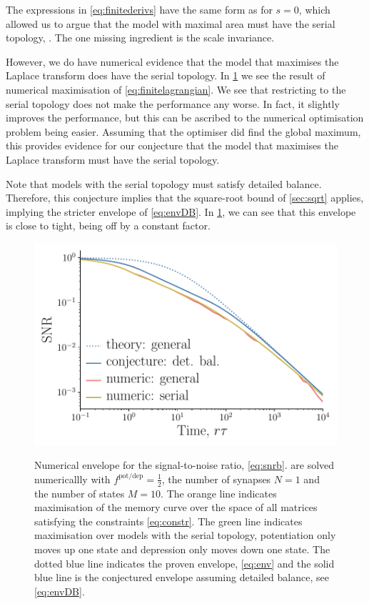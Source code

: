 \documentclass[12pt]{article}
\newcommand{\potdep}{^{\text{pot/dep}}}
\begin{document}
The expressions in \cref{eq:finitederivs} have the same form as for \(s=0\), which allowed us to argue that the model with maximal area must have the serial topology, \cite{Lahiri2013synapse}.
The one missing ingredient is the scale invariance.

However, we do have numerical evidence that the model that maximises the Laplace transform does have the serial topology.
In \cref{fig:envnum} we see the result of numerical maximisation of \cref{eq:finitelagrangian}.
We see that restricting to the serial topology does not make the performance any worse.
In fact, it slightly improves the performance, but this can be ascribed to the numerical optimisation problem being easier.
Assuming that the optimiser did find the global maximum, this provides evidence for our conjecture that the model that maximises the Laplace transform must have the serial topology.

Note that models with the serial topology must satisfy detailed balance.
Therefore, this conjecture implies that the square-root bound of \cref{sec:sqrt} applies, implying the stricter envelope of \cref{eq:envDB}.
In \cref{fig:envnum}, we can see that this envelope is close to tight, being off by a constant factor.


\begin{figure}[tb]
  \centering
  \includegraphics[width=0.8\linewidth]{LenvNum.pdf}\\
  \caption[Numerical envelope for the signal-to-noise ratio]
  {Numerical envelope for the signal-to-noise ratio, \eqref{eq:snrb}. 
   are solved numericallly with \(f\potdep=\frac{1}{2}\), the number of synapses \(N=1\) and the number of states \(M=10\).
  The orange line indicates maximisation of the memory curve over the space of all matrices satisfying the constraints \eqref{eq:constr}.
  The green line indicates maximisation over models with the serial topology, \ie potentiation only moves up one state and depression only moves down one state.
  The dotted blue line indicates the proven envelope, \cref{eq:env} and the solid blue line is the conjectured envelope assuming detailed balance, see \cref{eq:envDB}.}\label{fig:envnum}
\end{figure}
\end{document}
